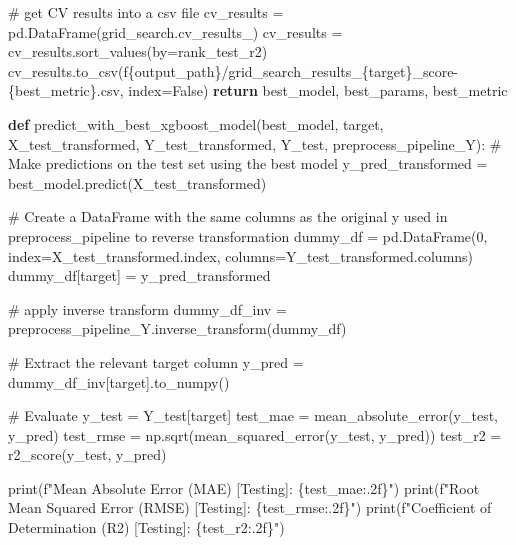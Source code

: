 \documentclass[
  letterpaper,
  DIV=11,
  numbers=noendperiod]{scrartcl}
\newenvironment{Shaded}{\begin{snugshade}}{\end{snugshade}}
\newcommand{\BuiltInTok}[1]{\textcolor[rgb]{0.00,0.23,0.31}{#1}}
\newcommand{\CommentTok}[1]{\textcolor[rgb]{0.37,0.37,0.37}{#1}}
\newcommand{\ControlFlowTok}[1]{\textcolor[rgb]{0.00,0.23,0.31}{\textbf{#1}}}
\newcommand{\DecValTok}[1]{\textcolor[rgb]{0.68,0.00,0.00}{#1}}
\newcommand{\KeywordTok}[1]{\textcolor[rgb]{0.00,0.23,0.31}{\textbf{#1}}}
\newcommand{\NormalTok}[1]{\textcolor[rgb]{0.00,0.23,0.31}{#1}}
\newcommand{\OperatorTok}[1]{\textcolor[rgb]{0.37,0.37,0.37}{#1}}
\newcommand{\SpecialCharTok}[1]{\textcolor[rgb]{0.37,0.37,0.37}{#1}}
\newcommand{\SpecialStringTok}[1]{\textcolor[rgb]{0.13,0.47,0.30}{#1}}
\newcommand{\StringTok}[1]{\textcolor[rgb]{0.13,0.47,0.30}{#1}}
\newcommand{\VariableTok}[1]{\textcolor[rgb]{0.07,0.07,0.07}{#1}}
\begin{document}
\begin{Shaded}
\begin{Highlighting}[]
    \CommentTok{\# get CV results into a csv file}
\NormalTok{    cv\_results }\OperatorTok{=}\NormalTok{ pd.DataFrame(grid\_search.cv\_results\_)}
\NormalTok{    cv\_results }\OperatorTok{=}\NormalTok{ cv\_results.sort\_values(by}\OperatorTok{=}\StringTok{\textquotesingle{}rank\_test\_r2\textquotesingle{}}\NormalTok{)}
\NormalTok{    cv\_results.to\_csv(}\SpecialStringTok{f\textquotesingle{}}\SpecialCharTok{\{}\NormalTok{output\_path}\SpecialCharTok{\}}\SpecialStringTok{/grid\_search\_results\_}\SpecialCharTok{\{}\NormalTok{target}\SpecialCharTok{\}}\SpecialStringTok{\_score{-}}\SpecialCharTok{\{}\NormalTok{best\_metric}\SpecialCharTok{\}}\SpecialStringTok{.csv\textquotesingle{}}\NormalTok{, index}\OperatorTok{=}\VariableTok{False}\NormalTok{)}
    \ControlFlowTok{return}\NormalTok{ best\_model, best\_params, best\_metric}

\KeywordTok{def}\NormalTok{ predict\_with\_best\_xgboost\_model(best\_model, target, X\_test\_transformed, Y\_test\_transformed, Y\_test, preprocess\_pipeline\_Y):}
    \CommentTok{\# Make predictions on the test set using the best model}
\NormalTok{    y\_pred\_transformed }\OperatorTok{=}\NormalTok{ best\_model.predict(X\_test\_transformed)}

    \CommentTok{\# Create a DataFrame with the same columns as the original y used in preprocess\_pipeline to reverse transformation}
\NormalTok{    dummy\_df }\OperatorTok{=}\NormalTok{ pd.DataFrame(}\DecValTok{0}\NormalTok{, index}\OperatorTok{=}\NormalTok{X\_test\_transformed.index, columns}\OperatorTok{=}\NormalTok{Y\_test\_transformed.columns)}
\NormalTok{    dummy\_df[target] }\OperatorTok{=}\NormalTok{ y\_pred\_transformed}

    \CommentTok{\# apply inverse transform}
\NormalTok{    dummy\_df\_inv }\OperatorTok{=}\NormalTok{ preprocess\_pipeline\_Y.inverse\_transform(dummy\_df)}

    \CommentTok{\# Extract the relevant target column}
\NormalTok{    y\_pred }\OperatorTok{=}\NormalTok{ dummy\_df\_inv[target].to\_numpy()}

    \CommentTok{\# Evaluate}
\NormalTok{    y\_test }\OperatorTok{=}\NormalTok{ Y\_test[target]}
\NormalTok{    test\_mae }\OperatorTok{=}\NormalTok{ mean\_absolute\_error(y\_test, y\_pred)}
\NormalTok{    test\_rmse }\OperatorTok{=}\NormalTok{ np.sqrt(mean\_squared\_error(y\_test, y\_pred))}
\NormalTok{    test\_r2 }\OperatorTok{=}\NormalTok{ r2\_score(y\_test, y\_pred)}

    \BuiltInTok{print}\NormalTok{(}\SpecialStringTok{f"Mean Absolute Error (MAE) [Testing]: }\SpecialCharTok{\{}\NormalTok{test\_mae}\SpecialCharTok{:.2f\}}\SpecialStringTok{"}\NormalTok{)}
    \BuiltInTok{print}\NormalTok{(}\SpecialStringTok{f"Root Mean Squared Error (RMSE) [Testing]: }\SpecialCharTok{\{}\NormalTok{test\_rmse}\SpecialCharTok{:.2f\}}\SpecialStringTok{"}\NormalTok{)}
    \BuiltInTok{print}\NormalTok{(}\SpecialStringTok{f"Coefficient of Determination (R2) [Testing]: }\SpecialCharTok{\{}\NormalTok{test\_r2}\SpecialCharTok{:.2f\}}\SpecialStringTok{"}\NormalTok{)}


\end{Highlighting}
\end{Shaded}
\end{document}
